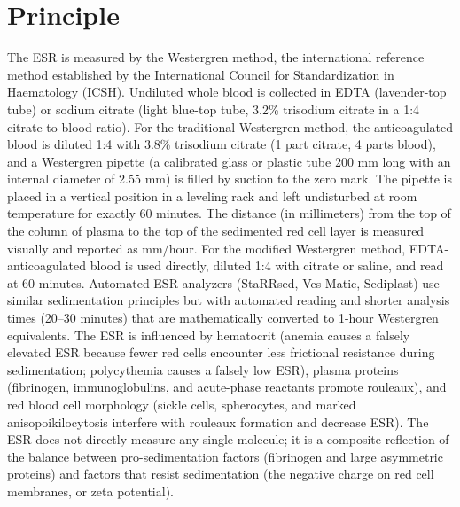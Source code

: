 \section*{Principle}
The ESR is measured by the Westergren method, the international reference method established by the International Council for Standardization in Haematology (ICSH). Undiluted whole blood is collected in EDTA (lavender-top tube) or sodium citrate (light blue-top tube, 3.2\% trisodium citrate in a 1:4 citrate-to-blood ratio). For the traditional Westergren method, the anticoagulated blood is diluted 1:4 with 3.8\% trisodium citrate (1 part citrate, 4 parts blood), and a Westergren pipette (a calibrated glass or plastic tube 200 mm long with an internal diameter of 2.55 mm) is filled by suction to the zero mark. The pipette is placed in a vertical position in a leveling rack and left undisturbed at room temperature for exactly 60 minutes. The distance (in millimeters) from the top of the column of plasma to the top of the sedimented red cell layer is measured visually and reported as mm/hour. For the modified Westergren method, EDTA-anticoagulated blood is used directly, diluted 1:4 with citrate or saline, and read at 60 minutes. Automated ESR analyzers (StaRRsed, Ves-Matic, Sediplast) use similar sedimentation principles but with automated reading and shorter analysis times (20--30 minutes) that are mathematically converted to 1-hour Westergren equivalents. The ESR is influenced by hematocrit (anemia causes a falsely elevated ESR because fewer red cells encounter less frictional resistance during sedimentation; polycythemia causes a falsely low ESR), plasma proteins (fibrinogen, immunoglobulins, and acute-phase reactants promote rouleaux), and red blood cell morphology (sickle cells, spherocytes, and marked anisopoikilocytosis interfere with rouleaux formation and decrease ESR). The ESR does not directly measure any single molecule; it is a composite reflection of the balance between pro-sedimentation factors (fibrinogen and large asymmetric proteins) and factors that resist sedimentation (the negative charge on red cell membranes, or zeta potential).

